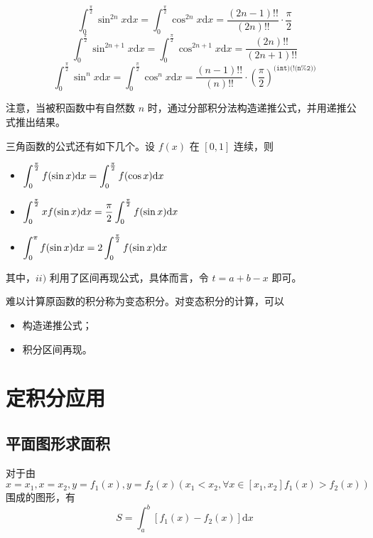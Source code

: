 
\begin{Theo}

    $$
        \int_0^\frac{\pi}{2} \sin^{2n} x \mathrm{d} x = \int_0^\frac{\pi}{2} \cos^{2n} x \mathrm{d} x = 
        \dfrac{(2n-1)!!}{(2n)!!}\cdot \dfrac{\pi}{2}
    $$ 
    $$
        \int_0^\frac{\pi}{2} \sin^{2n+1} x \mathrm{d} x = \int_0^\frac{\pi}{2} \cos^{2n+1} x \mathrm{d} x = 
        \dfrac{(2n)!!}{(2n+1)!!}
    $$ 
    $$
        \int_0^\frac{\pi}{2} \sin^{n} x \mathrm{d} x = \int_0^\frac{\pi}{2} \cos^{n} x \mathrm{d} x = 
        \dfrac{(n-1)!!}{(n)!!}\cdot (\dfrac{\pi}{2})^\texttt{(int)(!(n\%2))}
    $$ 
\end{Theo}

注意，当被积函数中有自然数 $ n $ 时，通过分部积分法构造递推公式，并用递推公式推出结果。

三角函数的公式还有如下几个。设 $ f(x) $ 在 $ [0,1] $ 连续，则
\begin{itemize}
    \item $ \displaystyle \int_0^\frac{\pi}{2} f(\sin x)\mathrm{d}x=\int_0^\frac{\pi}{2} f(\cos x)\mathrm{d}x $ 
    \item $\displaystyle \int_0^\frac{\pi}{2} xf(\sin x)\mathrm{d}x = 
    \dfrac{\pi}{2}\int_0^\frac{\pi}{2} f(\sin x)\mathrm{d}x $ 
    \item $\displaystyle \int_0^{\pi} f(\sin x)\mathrm{d}x = 2\int_0^\frac{\pi}{2} f(\sin x)\mathrm{d}x $ 
\end{itemize}

其中，$ ii) $ 利用了区间再现公式，具体而言，令 $ t = a + b - x $ 即可。

难以计算原函数的积分称为变态积分。对变态积分的计算，可以
\begin{itemize}
    \item 构造递推公式；
    \item 积分区间再现。
\end{itemize}

\section{定积分应用}

\subsection{平面图形求面积}


对于由 $ x = x_1, x = x_2,y = f_1(x), y = f_2(x) (x_1 < x_2,\forall x \in [x_1,x_2]f_1(x) > f_2(x)) $ 
围成的图形，有 $$
    S = \int_a^b[f_1(x)-f_2(x)]\mathrm{d}x
$$ 

